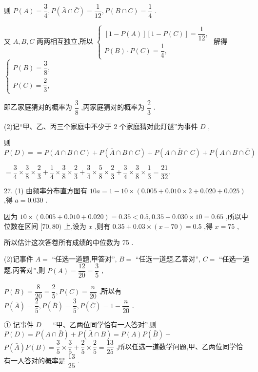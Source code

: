 则 $P\left( A\right)  = \dfrac{3}{4},P\left( {\bar{A} \cap  \bar{C}}\right)  = \dfrac{1}{12},P\left( {B \cap  C}\right)  = \dfrac{1}{4}$ .

又 $A,B,C$ 两两相互独立,所以 $\left\{  \begin{array}{l} \left\lbrack  {1 - P\left( A\right) }\right\rbrack  \left\lbrack  {1 - P\left( C\right) }\right\rbrack   = \dfrac{1}{12}, \\  P\left( B\right)  \cdot  P\left( C\right)  = \dfrac{1}{4}, \end{array}\right.$ 解得 $\left\{  \begin{array}{l} P\left( B\right)  = \dfrac{3}{8}, \\  P\left( C\right)  = \dfrac{2}{3}, \end{array}\right.$

即乙家庭猜对的概率为 $\dfrac{3}{8}$ ,丙家庭猜对的概率为 $\dfrac{2}{3}$ .

(2)记“甲、乙、丙三个家庭中不少于 2 个家庭猜对此灯谜”为事件 $D$ ,

则 $P\left( D\right)  =  = P\left( {A \cap  B \cap  C}\right)  + P\left( {\bar{A} \cap  B \cap  C}\right)  + P\left( {A \cap  \bar{B} \cap  C}\right)  + P\left( {A \cap  B \cap  \bar{C}}\right)$

$= \dfrac{3}{4} \times  \dfrac{3}{8} \times  \dfrac{2}{3} + \dfrac{1}{4} \times  \dfrac{3}{8} \times  \dfrac{2}{3} + \dfrac{3}{4} \times  \dfrac{5}{8} \times  \dfrac{2}{3} + \dfrac{3}{4} \times  \dfrac{3}{8} \times  \dfrac{1}{3} = \dfrac{21}{32}.$

27. (1) 由频率分布直方图有 ${10a} = 1 - {10} \times  \left( {{0.005} + {0.010} \times  2 + {0.020} + {0.025}}\right)$ ,得 $a = {0.030}$ .

因为 ${10} \times  \left( {{0.005} + {0.010} + {0.020}}\right)  = {0.35} < {0.5},{0.35} + {0.030} \times  {10} = {0.65}$ ,所以中位数在区间 $\lbrack {70},{80})$ 上,设为 $x$ ,则有 ${0.35} + {0.03} \times  \left( {x - {70}}\right)  = {0.5}$ ,得 $x = {75}$ ,

所以估计这次答卷所有成绩的中位数为 75 .

(2)记事件 $A =$ “任选一道题,甲答对”, $B =$ “任选一道题,乙答对”, $C =$ “任选一道题,丙答对”,则 $P\left( A\right)  = \dfrac{12}{20} = \dfrac{3}{5}$ ,

$P\left( B\right)  = \dfrac{8}{20} = \dfrac{2}{5},P\left( C\right)  = \dfrac{n}{20}$ ,所以有 $P\left( \bar{A}\right)  = \dfrac{2}{5},P\left( \bar{B}\right)  = \dfrac{3}{5},P\left( \bar{C}\right)  = 1 - \dfrac{n}{20}$ .

① 记事件 $D =$ “甲、乙两位同学恰有一人答对”,则 $P\left( D\right)  = P\left( {A \cap  \bar{B}}\right)  + P\left( {\bar{A} \cap  B}\right)  = P\left( A\right) P\left( \bar{B}\right)  +$  $P\left( \bar{A}\right) P\left( B\right)  = \dfrac{3}{5} \times  \dfrac{3}{5} + \dfrac{2}{5} \times  \dfrac{2}{5} = \dfrac{13}{25}$ ,所以任选一道数学问题,甲、乙两位同学恰有一人答对的概率是 $\dfrac{13}{25}$ .

